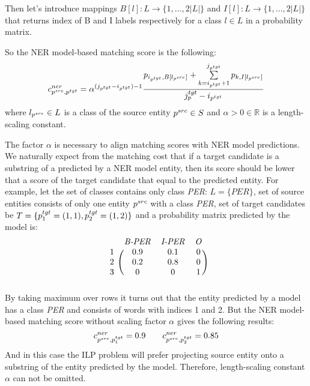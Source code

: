 Then let's introduce mappings \( B[l]: L \rightarrow \{ 1, \dots, 2|L| \} \) and
\( I[l]: L \rightarrow \{ 1, \dots, 2|L| \} \) that returns index of B and I labels respectively
for a class \( l \in L \) in a probability matrix.

So the NER model-based matching score is the following:
\begin{equation} \label{eq:ner_cost}
  c_{p^{src}, p^{tgt}}^{ner} = \alpha^{(j_{p^{tgt}} - i_{p^{tgt}}) - 1}
  \frac{
    p_{i_{p^{tgt}}, B[l_{p^{src}}]} +
    \sum\limits_{k = i_{p^{tgt}} + 1}^{j_{p^{tgt}}} p_{k, I[l_{p^{src}}]}
  }
  {j_p^{tgt} - i_{p^{tgt}}}
\end{equation}
where \( l_{p^{src}} \in L \) is a class of the source entity \( p^{src} \in S \) and
\( \alpha > 0 \in \mathbb{R} \) is a length-scaling constant.

The factor \( \alpha \) is necessary to align matching scores with NER model predictions.
We naturally expect from the matching cost that if a target candidate is a substring of a predicted
by a NER model entity, then its score should be lower that a score of the target candidate that
equal to the predicted entity. For example, let the set of classes contains only class \textit{PER}: \( L = \{ PER \}\),
set of source entities consists of only one entity \( p^{src} \) with a class \textit{PER},
set of target candidates be \( T =  \{ p_1^{tgt} = (1, 1), p_2^{tgt} = (1, 2) \} \) and a probability matrix predicted by the model is:
\[
  \begin{blockarray}{cccc}
    & \text{\textit{B-PER}} & \text{\textit{I-PER}} & \text{\textit{O}} \\
    \begin{block}{c(ccc)}
      1 & 0.9 & 0.1 & 0 \\
      2 & 0.2 & 0.8 & 0 \\
      3 & 0   & 0   & 1 \\
    \end{block}
  \end{blockarray}
\]
By taking maximum over rows it turns out that the entity predicted by a model has a class \textit{PER} and
consists of words with indices 1 and 2. But the NER model-based matching score without scaling factor
\( \alpha \) gives the following results:
\[
  c_{p^{src}, p_1^{tgt}}^{ner} = 0.9 \qquad c_{p^{src}, p_2^{tgt}}^{ner} = 0.85
\]
And in this case the ILP problem will prefer projecting source entity onto a substring of the entity predicted
by the model. Therefore, length-scaling constant \( \alpha \) can not be omitted.

